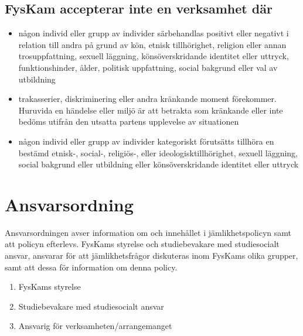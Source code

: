 \documentclass{dgovdoc}
\begin{document}
\subsection{FysKam accepterar inte en verksamhet där}

\begin{itemize}
\item någon individ eller grupp av individer särbehandlas positivt eller negativt i
relation till andra på grund av kön, etnisk tillhörighet, religion eller annan
trosuppfattning, sexuell läggning, könsöverskridande identitet eller uttryck,
funktionshinder, ålder, politisk uppfattning, social bakgrund eller val av
utbildning
\item trakasserier, diskriminering eller andra kränkande moment förekommer.
Huruvida en händelse eller miljö är att betrakta som kränkande eller inte
bedöms utifrån den utsatta partens upplevelse av situationen
\item någon individ eller grupp av individer kategoriskt förutsätts tillhöra en bestämd
etnisk-, social-, religiös-, eller ideologisktillhörighet, sexuell läggning, social
bakgrund eller utbildning eller könsöverskridande identitet eller uttryck
\end{itemize}

\section{Ansvarsordning}

Ansvarsordningen avser information om och innehållet i jämlikhetspolicyn samt att
policyn efterlevs.
FysKams styrelse och studiebevakare med studiesocialt ansvar, ansvarar för att
jämlikhetsfrågor diskuteras inom FysKams olika grupper, samt att dessa för information
om denna policy.

\begin{enumerate}
\item FysKams styrelse
\item Studiebevakare med studiesocialt ansvar
\item Ansvarig för verksamheten/arrangemanget
\end{enumerate}
\end{document}
